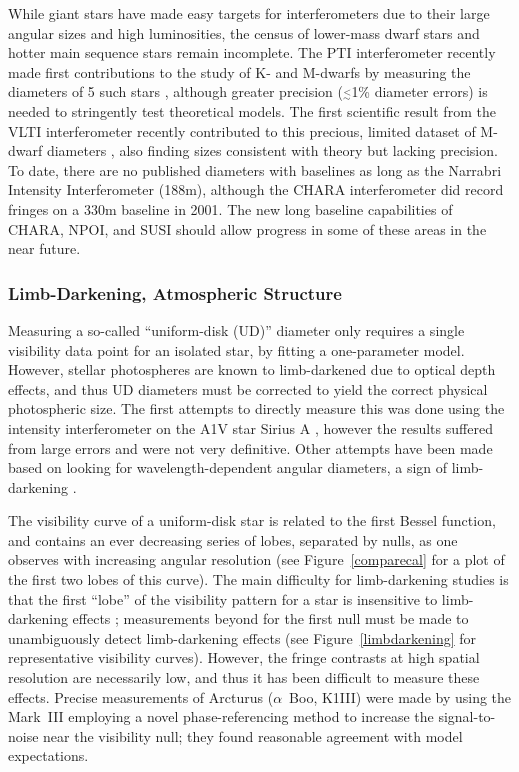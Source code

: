 \documentclass[12pt]{iopart}
\newcommand{\simle}{\mbox{$\stackrel{<}{_{\sim}}$}}
\begin{document}
While giant stars have made easy targets for
interferometers due to their large angular sizes and high
luminosities, the census of lower-mass dwarf stars and hotter main
sequence stars remain incomplete.  The PTI interferometer recently
made first contributions to the study of K- and M-dwarfs by measuring
the diameters of 5 such stars \citep{lane2001a}, although greater
precision ($\simle$1\% diameter errors) is needed to stringently test
theoretical models.  The first scientific result from the VLTI
interferometer recently contributed to this precious, limited dataset
of M-dwarf diameters \citep{segransan2003}, also finding sizes
consistent with theory but lacking precision.  To date, there are no
published diameters with baselines as long as the Narrabri Intensity
Interferometer (188m), although the CHARA interferometer did record
fringes on a 330m baseline in 2001.  The new long baseline
capabilities of CHARA, NPOI, and SUSI should allow progress in some of
these areas in the near future.
 
\subsubsection{Limb-Darkening, Atmospheric Structure}
Measuring a so-called ``uniform-disk (UD)'' diameter only requires a single
visibility data point for an isolated star, by fitting a one-parameter
model.  However, stellar photospheres are known to limb-darkened due
to optical depth effects, and thus  UD diameters
must be corrected to yield the correct physical photospheric size. The
first attempts to directly measure this was done using the intensity
interferometer on the A1V star Sirius A \citep{hanburybrown1974b}, however the
results suffered from large errors and were not very definitive.
Other attempts have been made based on looking for wavelength-dependent
angular diameters, a sign of limb-darkening \citep[e.g.,][]{ridgway1982,mozurk1991}.

The visibility curve of a uniform-disk star is related to the first
Bessel function, and contains an ever decreasing series of lobes,
separated by nulls, as one observes with increasing angular resolution
(see Figure~\ref{comparecal} for a plot of the first two lobes of this
curve).  The main difficulty for limb-darkening studies is that the
first ``lobe'' of the visibility pattern for a star is insensitive to
limb-darkening effects \citep[mathematically, it probes only the 2nd
moment of the brightness distribution; see][]{lachaume2003};
measurements beyond for the first null must be made to unambiguously
detect limb-darkening effects (see Figure~\ref{limbdarkening} for
representative visibility curves).  However, the fringe contrasts at
high spatial resolution are necessarily low, and thus it has been
difficult to measure these effects.  Precise
measurements of Arcturus ($\alpha$~Boo, K1III) were made by
\citet{quirrenbach1996} using the Mark~III employing a novel
phase-referencing method to increase the signal-to-noise near the
visibility null; they found reasonable agreement with model
expectations.
\end{document}
